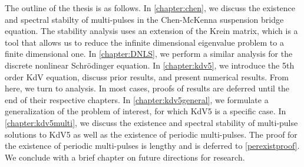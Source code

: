 \documentclass[thesis2.tex]{subfiles}
\begin{document}
The outline of the thesis is as follows. In \cref{chapter:chen}, we discuss the existence and spectral stabilty of multi-pulses in the Chen-McKenna suspension bridge equation. The stability analysis uses an extension of the Krein matrix, which is a tool that allows us to reduce the infinite dimensional eigenvalue problem to a finite dimensional one. In \cref{chapter:DNLS}, we perform a similar analysis for the discrete nonlinear Schr{\"o}dinger equation. In \cref{chapter:kdv5}, we introduce the 5th order KdV equation, discuss prior results, and present numerical results. From here, we turn to analysis. In most cases, proofs of results are deferred until the end of their respective chapters. In \cref{chapter:kdv5general}, we formulate a generalization of the problem of interest, for which KdV5 is a specific case. In \cref{chapter:kdv5multi}, we discuss the existence and spectral stability of multi-pulse solutions to KdV5 as well as the existence of periodic multi-pulses. The proof for the existence of periodic multi-pulses is lengthy and is deferred to \cref{perexistproof}. We conclude with a brief chapter on future directions for research.

\iffulldocument\else
	
	
\fi
\end{document}
